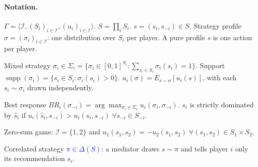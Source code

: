 \documentclass{article}
\newcommand{\new}[1]{\textcolor{blue}{#1}}
\begin{document}
\paragraph{Notation.}
$\Gamma = \langle\mathcal I, (S_i)_{i\in\mathcal I}, (u_i)_{i\in\mathcal I}\rangle$. $S=\prod_i S_i$. $s=(s_i,s_{-i})\in S$.
Strategy profile $\sigma=(\sigma_i)_{i\in\mathcal I}$: one distribution over $S_i$ per player. A pure profile $s$ is one action per player.

Mixed strategy $\sigma_i\in\Sigma_i = \{\sigma_i \in [0,1]^{S_i} : \sum_{s_i\in S_i}\sigma_i(s_i) = 1\}$.
Support $\operatorname{supp}(\sigma_i) = \{s_i\in S_i : \sigma_i(s_i) > 0\}$.
$u_i(\sigma) = E_{s\sim\sigma}[u_i(s)]$, with each $s_i\sim\sigma_i$ drawn independently.

Best response $BR_i(\sigma_{-i}) = \arg\max_{\sigma_i\in\Sigma_i} u_i(\sigma_i,\sigma_{-i})$.
$s_i$ is strictly dominated by $\hat s_i$ if $u_i(\hat s_i,s_{-i}) > u_i(s_i,s_{-i})\;\forall s_{-i}\in S_{-i}$.

Zero-sum game: $\mathcal I=\{1,2\}$ and $u_1(s_1,s_2) = -u_2(s_1,s_2)\;\forall(s_1,s_2)\in S_1\times S_2$.

Correlated strategy \new{$\pi\in\Delta(S)$}: a mediator draws $s\sim\pi$ and tells player $i$ only its recommendation $s_i$.
\end{document}
